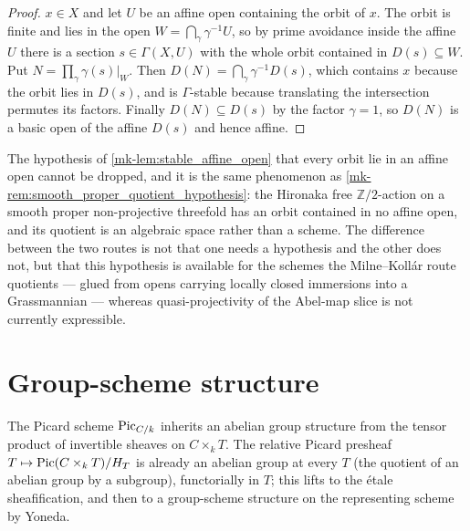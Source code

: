 \begin{proof}
  \leanokLet \(x \in X\) and let \(U\) be an affine open containing the orbit of \(x\).
  The orbit is finite and lies in the open
  \(W = \bigcap_{\gamma} \gamma^{-1} U\), so by prime avoidance inside the affine
  \(U\) there is a section \(s \in \Gamma(X, U)\) with the whole orbit contained
  in \(D(s) \subseteq W\). Put \(N = \prod_{\gamma} \gamma(s)|_W\). Then
  \(D(N) = \bigcap_{\gamma} \gamma^{-1} D(s)\), which contains \(x\) because the
  orbit lies in \(D(s)\), and is \(\Gamma\)-stable because translating the
  intersection permutes its factors. Finally \(D(N) \subseteq D(s)\) by the
  factor \(\gamma = 1\), so \(D(N)\) is a basic open of the affine \(D(s)\) and
  hence affine.
\end{proof}

\begin{remark}
  \label{mk-rem:orbit_in_affine_hypothesis}
  The hypothesis of \ref{mk-lem:stable_affine_open} that every orbit lie in an
  affine open cannot be dropped, and it is the same phenomenon as
  \ref{mk-rem:smooth_proper_quotient_hypothesis}: the Hironaka free
  \(\mathbb{Z}/2\)-action on a smooth proper non-projective threefold has an
  orbit contained in no affine open, and its quotient is an algebraic space
  rather than a scheme. The difference between the two routes is not that one
  needs a hypothesis and the other does not, but that this hypothesis is
  available for the schemes the Milne--Koll\'ar route quotients --- glued from
  opens carrying locally closed immersions into a Grassmannian --- whereas
  quasi-projectivity of the Abel-map slice is not currently expressible.
\end{remark}

\section{Group-scheme structure}
\label{mk-sec:fga_pic_group_structure}

The Picard scheme \(\operatorname{Pic}_{C/k}\) inherits an abelian group structure from
the tensor product of invertible sheaves on \(C \times_k T\). The relative
Picard presheaf \(T \mapsto \operatorname{Pic}(C \times_k T)/H_T\) is already an abelian
group at every \(T\) (the quotient of an abelian group by a subgroup),
functorially in \(T\); this lifts to the \'etale sheafification, and then
to a group-scheme structure on the representing scheme by Yoneda.

